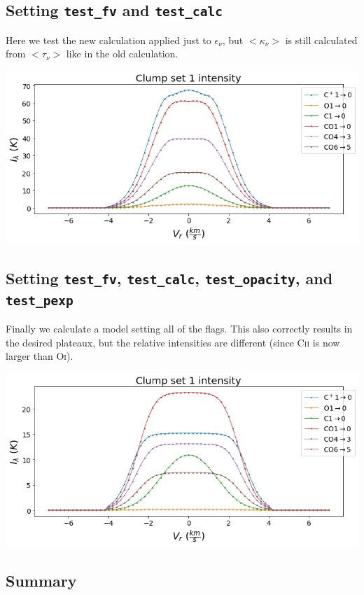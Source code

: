 \documentclass[a4paper]{article}
\begin{document}
    \subsection{Setting \texttt{test\_fv} and \texttt{test\_calc}}

    Here we test the new calculation applied just to \(\epsilon_\nu\), but \(<\kappa_\nu>\) is still calculated from \(<\tau_\nu>\) like in the old calculation.

    \includegraphics*[width=\linewidth]{voxel_error_fv-calc-opacity.png}

    \subsection{Setting \texttt{test\_fv}, \texttt{test\_calc}, \texttt{test\_opacity}, and \texttt{test\_pexp}}

    Finally we calculate a model setting all of the flags.
    This also correctly results in the desired plateaux, but the relative intensities are different (since C\textsc{ii} is now larger than O\textsc{i}).

    \includegraphics*[width=\linewidth]{voxel_error_fv-calc-opacity-pexp.png}

    \subsection{Summary}
\end{document}
